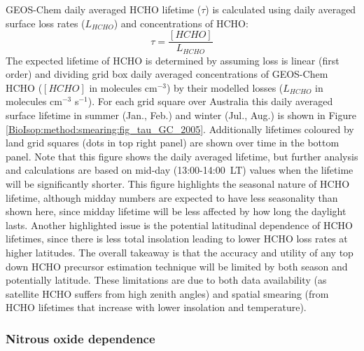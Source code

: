       
      GEOS-Chem daily averaged HCHO lifetime ($\tau$) is calculated using daily averaged surface loss rates ($L_{HCHO}$) and concentrations of HCHO:
      \begin{equation*}
      \tau = \frac{[HCHO]}{L_{HCHO}}
      \end{equation*}
      The expected lifetime of HCHO is determined by assuming loss is linear (first order) and dividing grid box daily averaged concentrations of GEOS-Chem HCHO ($[HCHO]$ in molecules cm$^{-3}$) by their modelled losses ($L_{HCHO}$ in molecules cm$^{-3}$ s$^{-1}$).
      For each grid square over Australia this daily averaged surface lifetime in summer (Jan., Feb.) and winter (Jul., Aug.) is shown in Figure \ref{BioIsop:method:smearing:fig_tau_GC_2005}.
      Additionally lifetimes coloured by land grid squares (dots in top right panel) are shown over time in the bottom panel.
      Note that this figure shows the daily averaged lifetime, but further analysis and calculations are based on mid-day (13:00-14:00~LT) values when the lifetime will be significantly shorter. 
      This figure highlights the seasonal nature of HCHO lifetime, although midday numbers are expected to have less seasonality than shown here, since midday lifetime will be less affected by how long the daylight lasts.
      Another highlighted issue is the potential latitudinal dependence of HCHO lifetimes, since there is less total insolation leading to lower HCHO loss rates at higher latitudes.
      The overall takeaway is that the accuracy and utility of any top down HCHO precursor estimation technique will be limited by both season and potentially latitude.
      These limitations are due to both data availability (as satellite HCHO suffers from high zenith angles) and spatial smearing (from HCHO lifetimes that increase with lower insolation and temperature).
      
      
    
    \subsubsection{Nitrous oxide dependence}
      
